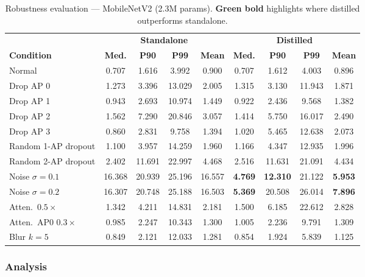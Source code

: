 \documentclass[11pt,a4paper]{article}
\newcommand{\best}[1]{\textcolor{bestcolor}{\textbf{#1}}}
\newcommand{\worst}[1]{\textcolor{worstcolor}{#1}}
\begin{document}
\begin{table}[H]
\centering
\caption{Robustness evaluation --- MobileNetV2 (2.3M params). \best{Green bold} highlights where distilled outperforms standalone.}
\label{tab:robust_mobilenet}
\begin{tabular}{@{}lcccc|cccc@{}}
\toprule
 & \multicolumn{4}{c|}{\textbf{Standalone}} & \multicolumn{4}{c}{\textbf{Distilled}} \\
\textbf{Condition} & \textbf{Med.} & \textbf{P90} & \textbf{P99} & \textbf{Mean} & \textbf{Med.} & \textbf{P90} & \textbf{P99} & \textbf{Mean} \\
\midrule
Normal                 & 0.707 & 1.616 & 3.992  & 0.900 & 0.707 & 1.612 & 4.003  & 0.896 \\
\midrule
Drop AP 0              & 1.273 & 3.396 & 13.029 & 2.005 & 1.315 & 3.130 & 11.943 & 1.871 \\
Drop AP 1              & 0.943 & 2.693 & 10.974 & 1.449 & 0.922 & 2.436 & 9.568  & 1.382 \\
Drop AP 2              & 1.562 & 7.290 & 20.846 & 3.057 & 1.414 & 5.750 & 16.017 & 2.490 \\
Drop AP 3              & 0.860 & 2.831 & 9.758  & 1.394 & 1.020 & 5.465 & 12.638 & 2.073 \\
Random 1-AP dropout    & 1.100 & 3.957 & 14.259 & 1.960 & 1.166 & 4.347 & 12.935 & 1.996 \\
Random 2-AP dropout    & 2.402 & 11.691& 22.997 & 4.468 & 2.516 & 11.631& 21.091 & 4.434 \\
\midrule
Noise $\sigma\!=\!0.1$ & \worst{16.368}& 20.939& 25.196 & 16.557& \best{4.769} & \best{12.310}& 21.122 & \best{5.953} \\
Noise $\sigma\!=\!0.2$ & \worst{16.307}& 20.748& 25.188 & 16.503& \best{5.369} & 20.508& 26.014 & \best{7.896} \\
\midrule
Atten.\ $0.5\times$    & 1.342 & 4.211 & 14.831 & 2.181 & 1.500 & 6.185 & 22.612 & 2.828 \\
Atten.\ AP0 $0.3\times$& 0.985 & 2.247 & 10.343 & 1.300 & 1.005 & 2.236 & 9.791  & 1.309 \\
Blur $k\!=\!5$         & 0.849 & 2.121 & 12.033 & 1.281 & 0.854 & 1.924 & 5.839  & 1.125 \\
\bottomrule
\end{tabular}
\end{table}

\subsubsection{Analysis}
\end{document}

